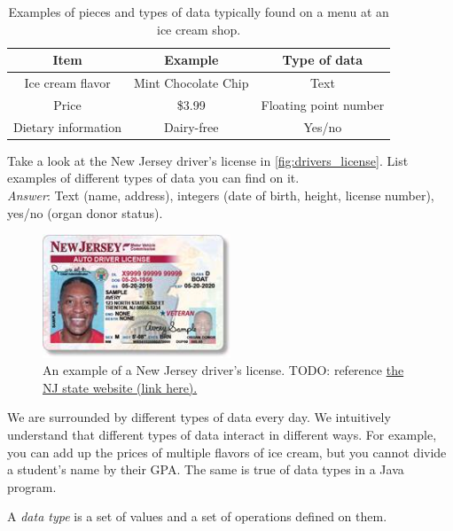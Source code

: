 \begin{table}[h!]
\centering
\begin{tabular}{ |c|c|c| }
 \hline
 Item & Example & Type of data \\
 \hline
 \hline
 Ice cream flavor & Mint Chocolate Chip & Text \\
 Price & \$3.99 & Floating point number \\
 Dietary information & Dairy-free & Yes/no \\
 \hline
\end{tabular}
\caption{Examples of pieces and types of data typically found on a menu at an ice cream shop.}
\label{table:ice_cream_menu}
\end{table}

\begin{example}
Take a look at the New Jersey driver's license in \autoref{fig:drivers_license}. List examples of different types of data you can find on it. \\

\noindent \emph{Answer}: Text (name, address), integers (date of birth, height, license number), yes/no (organ donor status).
\end{example}

\begin{figure}[h!]
  \centering
  \includegraphics[width=0.5\textwidth]{images/nj_drivers_license}
  \caption{An example of a New Jersey driver's license. TODO: reference \href{https://www.state.nj.us/mvc/images/vetdefig.jpg}{the NJ state website (link here).}}
  \label{fig:drivers_license}
\end{figure}

We are surrounded by different types of data every day. We intuitively understand that different types of data interact in different ways. For example, you can add up the prices of multiple flavors of ice cream, but you cannot divide a student's name by their GPA. The same is true of data types in a Java program.

\begin{definition}
A \emph{data type} is a set of values and a set of operations defined on them.
\end{definition}

